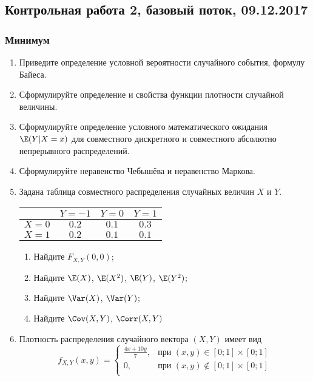 \subsection{Контрольная работа 2, базовый поток, 09.12.2017}



\subsubsection{Минимум}

\begin{enumerate}
\item Приведите определение условной вероятности случайного события, формулу Байеса.
\item Сформулируйте определение и свойства функции плотности случайной величины.
\item Сформулируйте определение  условного математического ожидания $\E(Y|X=x)$ для совместного дискретного и совместного абсолютно непрерывного распределений.
\item Сформулируйте неравенство Чебышёва и неравенство Маркова.

\item Задана таблица совместного распределения случайных величин $X$ и $Y$.
\begin{center}
\begin{tabular}{lccc}
\toprule
                       & $Y=-1$  & $Y=0$   & $Y=1$   \\
 \midrule
$X=0$                 & $0.2$ & $0.1$ & $0.3$ \\
 $X=1$                 & $0.2$ & $0.1$ & $0.1$ \\
 \bottomrule
\end{tabular}
\end{center}


\begin{enumerate}
    \item Найдите $F_{X,Y}(0, 0)$;
    \item Найдите $\E(X)$, $\E(X^2)$, $\E(Y)$, $\E(Y^2)$;
    \item Найдите $\Var(X)$, $\Var(Y)$;
    \item Найдите $\Cov(X, Y)$, $\Corr(X, Y)$
\end{enumerate}
\item Плотность распределения случайного вектора $(X,Y)$ имеет вид
\[
f_{X,Y}(x,y) =
\begin{cases}
\frac{4x+10y}{7}, & \text{при } (x,y) \in [0;1] \times [0;1] \\
0 , & \text{при } (x,y) \not\in [0;1] \times [0;1] \\
\end{cases}
\]


\end{enumerate}
